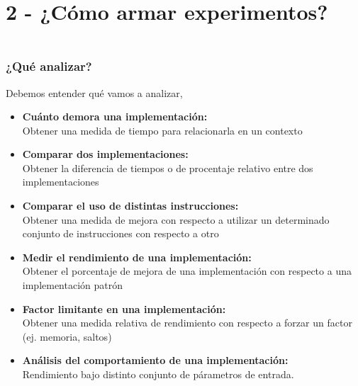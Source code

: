 \documentclass[aspectratio=169]{beamer}
\begin{document}
\section{2 - ¿Cómo armar experimentos?}

\begin{frame}[fragile]
    \frametitle{ \vspace{-1cm} \flushright \colorbox{verdeuca}{ \small \textcolor{white}{ \footnotesize \secname } }\\
    ¿Qué analizar?}
    Debemos entender qué vamos a analizar, \small
    \begin{itemize}
     \item \textbf{Cuánto demora una implementación:}\\
     Obtener una medida de tiempo para relacionarla en un contexto
     \vskip 2pt \pause
     \item \textbf{Comparar dos implementaciones:}\\
     Obtener la diferencia de tiempos o de procentaje relativo entre dos implementaciones
     \vskip 2pt \pause
     \item \textbf{Comparar el uso de distintas instrucciones:}\\
     Obtener una medida de mejora con respecto a utilizar un determinado conjunto de instrucciones con respecto a otro
     \vskip 2pt \pause
     \item \textbf{Medir el rendimiento de una implementación:}\\
     Obtener el porcentaje de mejora de una implementación con respecto a una implementación patrón
     \vskip 2pt \pause
     \item \textbf{Factor limitante en una implementación:}\\
     Obtener una medida relativa de rendimiento con respecto a forzar un factor (ej. memoria, saltos)
     \vskip 2pt \pause
     \item \textbf{Análisis del comportamiento de una implementación:}\\
     Rendimiento bajo distinto conjunto de párametros de entrada.
    \end{itemize}
\end{frame}
\end{document}
